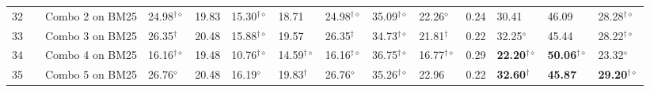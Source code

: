 \begin{table*}
{\begin{tabular}{ccllllllllllll}
32 &  & Combo 2 on BM25  & 24.98$^{\dagger\diamond}$  & 19.83  & 15.30$^{\dagger\diamond}$  & 18.71  & 24.98$^{\dagger\diamond}$  & 35.09$^{\dagger\diamond}$  & 22.26$^{\diamond}$  & 0.24  & 30.41  & 46.09  & 28.28$^{\dagger\diamond}$ \tabularnewline
33 &  & Combo 3 on BM25  & 26.35$^{\dagger}$  & 20.48  & 15.88$^{\dagger\diamond}$  & 19.57  & 26.35$^{\dagger}$  & 34.73$^{\dagger\diamond}$  & 21.81$^{\dagger}$  & 0.22  & 32.25$^{\diamond}$  & 45.44  & 28.22$^{\dagger\diamond}$\tabularnewline
    34 &  & Combo 4 on BM25  & 16.16$^{\dagger\diamond}$  & 19.48  & 10.76$^{\dagger\diamond}$  & 14.59$^{\dagger\diamond}$  & 16.16$^{\dagger\diamond}$  & 36.75$^{\dagger\diamond}$  & 16.77$^{\dagger\diamond}$  & 0.29  & \textbf{22.20}$^{\dagger\diamond}$  & \textbf{50.06}$^{\dagger\diamond}$  & 23.32$^{\diamond}$\tabularnewline
    35 &  & Combo 5 on BM25  & 26.76$^{\diamond}$  & 20.48  & 16.19$^{\diamond}$  & 19.83$^{\dagger}$  & 26.76$^{\diamond}$  & 35.26$^{\dagger\diamond}$  & 22.96  & 0.22  & \textbf{32.60}$^{\dagger}$  & \textbf{45.87} & \textbf{29.20}$^{\dagger\diamond}$\tabularnewline
\bottomrule
\end{tabular}} %
\end{table*}

